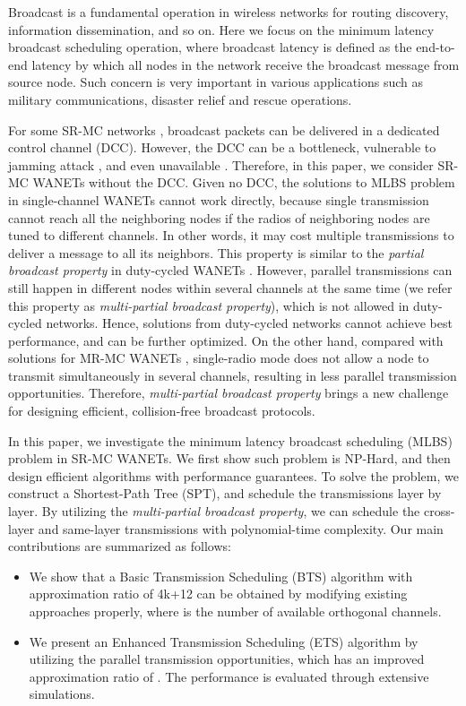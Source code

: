 \documentclass[10pt, conference]{IEEEtran}
\begin{document}
Broadcast is a fundamental operation in wireless networks for
routing discovery, information dissemination, and so on. Here
we focus on the minimum latency broadcast scheduling operation,
where broadcast latency is defined as the end-to-end latency by
which all nodes in the network receive the broadcast message
from source node. Such concern is very important in various
applications such as military communications, disaster relief
and rescue operations.

For some SR-MC networks \cite{CCR-MAC}, broadcast packets can be delivered in a dedicated control channel (DCC). However, the DCC can be a bottleneck, vulnerable to jamming attack \cite{Jamming}, and even unavailable \cite{CRAHNs}. Therefore, in this paper, we consider SR-MC WANETs without the DCC. Given no DCC, the solutions to MLBS problem in single-channel WANETs \cite{UDG, info07} cannot work directly, because single transmission cannot reach all the neighboring nodes if the radios of neighboring nodes are tuned to different channels. In other words, it may cost multiple transmissions to deliver a message to all its neighbors. This property is similar to the \emph{partial broadcast property} in duty-cycled WANETs \cite{ICC09, GC11}. However, parallel transmissions can still happen in different nodes within several channels at the same time (we refer this property as \emph{multi-partial broadcast property}), which is not allowed in duty-cycled networks. Hence, solutions from duty-cycled networks cannot achieve best performance, and can be further optimized. On the other hand, compared with solutions for MR-MC WANETs \cite{MR-MC}, single-radio mode does not allow a node to transmit simultaneously in several channels, resulting in less parallel transmission opportunities. Therefore, \emph{multi-partial broadcast property} brings a new challenge for designing efficient, collision-free broadcast protocols.

In this paper, we investigate the minimum latency broadcast
scheduling (MLBS) problem in SR-MC WANETs. We first show such
problem is NP-Hard, and then design efficient algorithms with
performance guarantees. To solve the problem, we construct a
Shortest-Path Tree (SPT), and schedule the transmissions layer
by layer. By utilizing the \emph{multi-partial broadcast
property}, we can schedule the cross-layer and same-layer
transmissions with polynomial-time complexity. Our main
contributions are summarized as follows:
\begin{itemize}
  \item We show that a Basic Transmission Scheduling (BTS) algorithm with approximation ratio of 4k+12 can be obtained by modifying existing approaches properly, where  is the number of available orthogonal channels.
  \item We present an Enhanced Transmission Scheduling (ETS) algorithm by utilizing the parallel transmission opportunities, which has an improved approximation ratio of . The performance is evaluated through extensive simulations.
\end{itemize}
\end{document}
